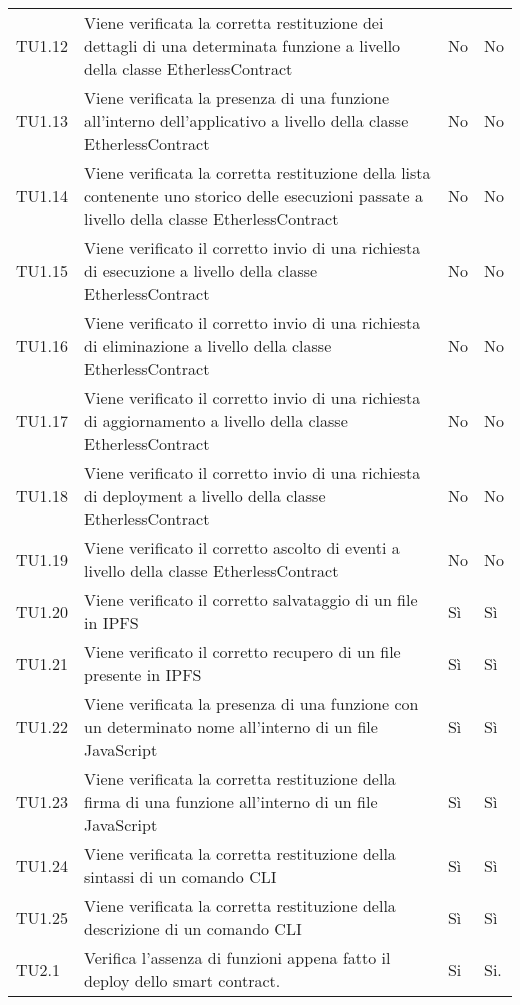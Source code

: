 \begin{longtable}{
		>{\centering}p{}
		>{}p{}
		>{\centering}p{}
		>{\centering}p{} }
		TU1.12 &
		Viene verificata la corretta restituzione dei dettagli di una determinata funzione a livello della classe EtherlessContract &
		No &
		No \tabularnewline

		TU1.13 &
		Viene verificata la presenza di una funzione all’interno dell’applicativo a livello della classe EtherlessContract &
		No &
		No \tabularnewline

		TU1.14 &
		Viene verificata la corretta restituzione della lista contenente uno storico delle esecuzioni passate a livello della classe EtherlessContract &
		No &
		No \tabularnewline

		TU1.15 &
		Viene verificato il corretto invio di una richiesta di esecuzione a livello della classe EtherlessContract &
		No &
		No \tabularnewline

		TU1.16 &
		Viene verificato il corretto invio di una richiesta di eliminazione a livello della classe EtherlessContract &
		No &
		No \tabularnewline

		TU1.17 &
		Viene verificato il corretto invio di una richiesta di aggiornamento a livello della classe EtherlessContract &
		No &
		No \tabularnewline

		TU1.18 &
		Viene verificato il corretto invio di una richiesta di deployment a livello della classe EtherlessContract &
		No &
		No \tabularnewline

		TU1.19 &
		Viene verificato il corretto ascolto di eventi a livello della classe EtherlessContract &
		No &
		No \tabularnewline

		TU1.20 &
		Viene verificato il corretto salvataggio di un file in IPFS &
		Sì &
		Sì \tabularnewline

		TU1.21 &
		Viene verificato il corretto recupero di un file presente in IPFS &
		Sì &
		Sì \tabularnewline

		TU1.22 &
		Viene verificata la presenza di una funzione con un determinato nome all’interno di un file JavaScript &
		Sì &
		Sì \tabularnewline

		TU1.23 &
		Viene verificata la corretta restituzione della firma di una funzione all’interno di un file JavaScript &
		Sì &
		Sì \tabularnewline

		TU1.24 &
		Viene verificata la corretta restituzione della sintassi di un comando CLI &
		Sì &
		Sì \tabularnewline

		TU1.25 &
		Viene verificata la corretta restituzione della descrizione di un comando CLI &
		Sì &
		Sì \tabularnewline
		
		
TU2.1   &  Verifica l'assenza di funzioni appena fatto il deploy dello smart contract. &
Si & Si. \tabularnewline


\end{longtable}
